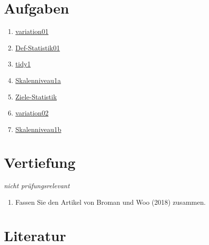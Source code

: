 \documentclass[
  a4paper,
  DIV=11]{scrreprt}
\providecommand{\tightlist}{%
  \setlength{\itemsep}{0pt}\setlength{\parskip}{0pt}}\usepackage{longtable,booktabs,array}
\theoremstyle{definition}
\theoremstyle{definition}
\theoremstyle{remark}
\begin{document}
\hypertarget{aufgaben}{%
\section{Aufgaben}\label{aufgaben}}

\begin{enumerate}
\def\labelenumi{\arabic{enumi}.}
\tightlist
\item
  \href{https://datenwerk.netlify.app/posts/variation01/variation01.html}{variation01}
\item
  \href{https://datenwerk.netlify.app/posts/def-statistik01/def-statistik01}{Def-Statistik01}
\item
  \href{https://datenwerk.netlify.app/posts/tidy1/tidy1.html}{tidy1}
\item
  \href{https://datenwerk.netlify.app/posts/skalenniveau1a/skalenniveau1a}{Skalenniveau1a}
\item
  \href{https://datenwerk.netlify.app/posts/ziele-statistik/ziele-statistik}{Ziele-Statistik}
\item
  \href{https://datenwerk.netlify.app/posts/variation02/variation02.html}{variation02}
\item
  \href{https://datenwerk.netlify.app/posts/skalenniveau1b/skalenniveau1b}{Skalenniveau1b}
\end{enumerate}

\hypertarget{vertiefung}{%
\section{Vertiefung}\label{vertiefung}}

\emph{nicht prüfungsrelevant}

\begin{enumerate}
\def\labelenumi{\arabic{enumi}.}
\tightlist
\item
  Fassen Sie den Artikel von Broman und Woo (2018) zusammen.
\end{enumerate}

\hypertarget{literatur-1}{%
\section*{Literatur}\label{literatur-1}}
\end{document}
